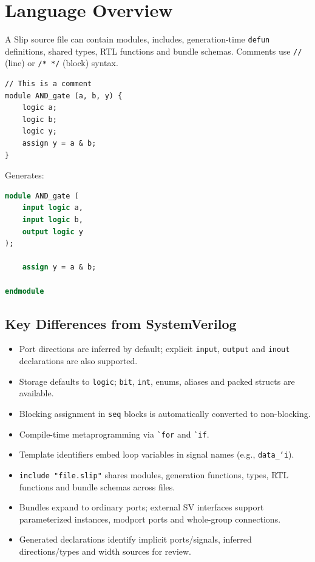 \documentclass[lang=en,11pt]{elegantbook}
\newcommand{\code}[1]{\texttt{#1}}
\newcommand{\slipinline}[1]{\lstinline[language=Slip]|#1|}
\begin{document}
\chapter{Language Overview}

A Slip source file can contain modules, includes, generation-time \code{defun}
definitions, shared types, RTL functions and bundle schemas. Comments use
\code{//} (line) or \code{/* */} (block) syntax.

\begin{lstlisting}[language=Slip]
// This is a comment
module AND_gate (a, b, y) {
    logic a;
    logic b;
    logic y;
    assign y = a & b;
}
\end{lstlisting}

Generates:

\begin{lstlisting}[language=SystemVerilog]
module AND_gate (
    input logic a,
    input logic b,
    output logic y
);

    assign y = a & b;

endmodule
\end{lstlisting}

\section{Key Differences from SystemVerilog}

\begin{itemize}
  \item Port directions are inferred by default; explicit \code{input}, \code{output} and \code{inout} declarations are also supported.
  \item Storage defaults to \code{logic}; \code{bit}, \code{int}, enums, aliases and packed structs are available.
  \item Blocking assignment in \code{seq} blocks is automatically converted to non-blocking.
  \item Compile-time metaprogramming via \slipinline{`for} and \slipinline{`if}.
  \item Template identifiers embed loop variables in signal names (e.g., \code{data\_`i}).
  \item \code{include "file.slip"} shares modules, generation functions, types, RTL functions and bundle schemas across files.
  \item Bundles expand to ordinary ports; external SV interfaces support parameterized instances, modport ports and whole-group connections.
  \item Generated declarations identify implicit ports/signals, inferred directions/types and width sources for review.
\end{itemize}
\end{document}
